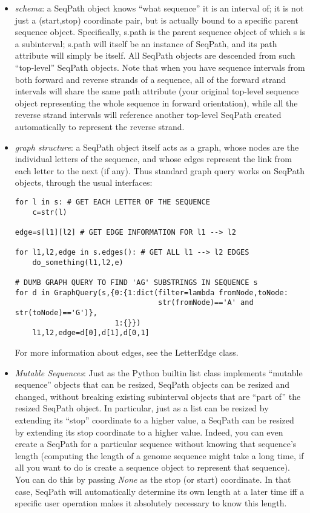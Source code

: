 \documentclass{howto}
\begin{document}
\begin{itemize}
\item
{\em schema}: a SeqPath object knows ``what sequence'' it is an interval of;
it is not just a (start,stop) coordinate pair, but is actually bound to a specific
parent sequence object.  Specifically, s.path is the parent sequence object of
which s is a subinterval; s.path will itself be an instance of SeqPath, and its path
attribute will simply be itself.  All SeqPath objects are descended from such ``top-level''
SeqPath objects.  Note that when you have sequence intervals from both forward
and reverse strands of a sequence, all of the forward strand intervals will share
the same path attribute (your original top-level sequence object representing
the whole sequence in forward orientation), while all the reverse strand intervals
will reference another top-level SeqPath created automatically to represent the
reverse strand.

\item
{\em graph structure}: a SeqPath object itself acts as a graph, whose nodes are
the individual letters of the sequence, and whose edges represent the link 
from each letter to the next (if any).  Thus standard graph query works on
SeqPath objects, through the usual interfaces:

\begin{verbatim}
for l in s: # GET EACH LETTER OF THE SEQUENCE
    c=str(l)

edge=s[l1][l2] # GET EDGE INFORMATION FOR l1 --> l2

for l1,l2,edge in s.edges(): # GET ALL l1 --> l2 EDGES
    do_something(l1,l2,e)

# DUMB GRAPH QUERY TO FIND 'AG' SUBSTRINGS IN SEQUENCE s
for d in GraphQuery(s,{0:{1:dict(filter=lambda fromNode,toNode:
                                 str(fromNode)=='A' and str(toNode)=='G')},
                       1:{}})
    l1,l2,edge=d[0],d[1],d[0,1]
\end{verbatim}  

For more information about edges, see the LetterEdge class.

\item
{\em Mutable Sequences}: Just as the Python builtin list class implements
``mutable sequence'' objects that can be resized, SeqPath objects can be
resized and changed, without breaking existing subinterval objects that
are ``part of'' the resized SeqPath object.  In particular, just as a list
can be resized by extending its ``stop'' coordinate to a higher value, a SeqPath can
be resized by extending its stop coordinate to a higher value.  Indeed,
you can even create a SeqPath for a particular sequence without knowing that
sequence's length (computing the length of a genome sequence might take a long
time, if all you want to do is create a sequence object to represent that
sequence).  You can do this by passing {\em None} as the stop (or start)
coordinate.  In that case, SeqPath will automatically determine its own
length at a later time iff a specific user operation makes it absolutely 
necessary to know this length.


\end{itemize}
\end{document}
